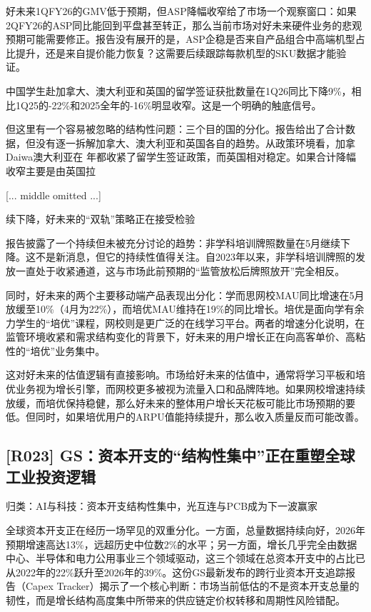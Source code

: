 \documentclass[11pt]{ctexart}
\begin{document}
好未来1QFY26的GMV低于预期，但ASP降幅收窄给了市场一个观察窗口：如果2QFY26的ASP同比能回到平盘甚至转正，那么当前市场对好未来硬件业务的悲观预期可能需要修正。报告没有展开的是，ASP企稳是否来自产品组合中高端机型占比提升，还是来自提价能力恢复？这需要后续跟踪每款机型的SKU数据才能验证。

中国学生赴加拿大、澳大利亚和英国的留学签证获批数量在1Q26同比下降9\%，相比1Q25的-22\%和2025全年的-16\%明显收窄。这是一个明确的触底信号。

但这里有一个容易被忽略的结构性问题：三个目的国的分化。报告给出了合计数据，但没有逐一拆解加拿大、澳大利亚和英国各自的趋势。从政策环境看，加拿Daiwa澳大利亚在 年都收紧了留学生签证政策，而英国相对稳定。如果合计降幅收窄主要是由英国拉

[... middle omitted ...]

续下降，好未来的“双轨”策略正在接受检验

报告披露了一个持续但未被充分讨论的趋势：非学科培训牌照数量在5月继续下降。这不是新消息，但它的持续性值得关注。自2023年以来，非学科培训牌照的发放一直处于收紧通道，这与市场此前预期的“监管放松后牌照放开”完全相反。

同时，好未来的两个主要移动端产品表现出分化：学而思网校MAU同比增速在5月放缓至10\%（4月为22\%），而培优MAU维持在19\%的同比增长。培优是面向学有余力学生的“培优”课程，网校则是更广泛的在线学习平台。两者的增速分化说明，在监管环境收紧和需求结构变化的背景下，好未来的用户增长正在向高客单价、高粘性的“培优”业务集中。

这对好未来的估值逻辑有直接影响。市场给好未来的估值中，通常将学习平板和培优业务视为增长引擎，而网校更多被视为流量入口和品牌阵地。如果网校增速持续放缓，而培优保持稳健，那么好未来的整体用户增长天花板可能比市场预期的要低。但同时，如果培优用户的ARPU值能持续提升，那么收入质量反而可能改善。

\subsection{[R023] GS：资本开支的“结构性集中”正在重塑全球工业投资逻辑}
{\small\color{refgray}归类：AI与科技：资本开支结构性集中，光互连与PCB成为下一波赢家}

全球资本开支正在经历一场罕见的双重分化。一方面，总量数据持续向好，2026年预期增速高达13\%，远超历史中位数2\%的水平；另一方面，增长几乎完全由数据中心、半导体和电力公用事业三个领域驱动，这三个领域在总资本开支中的占比已从2022年的22\%跃升至2026年的39\%。这份GS最新发布的跨行业资本开支追踪报告（Capex Tracker）揭示了一个核心判断：市场当前低估的不是资本开支总量的韧性，而是增长结构高度集中所带来的供应链定价权转移和周期性风险错配。
\end{document}
